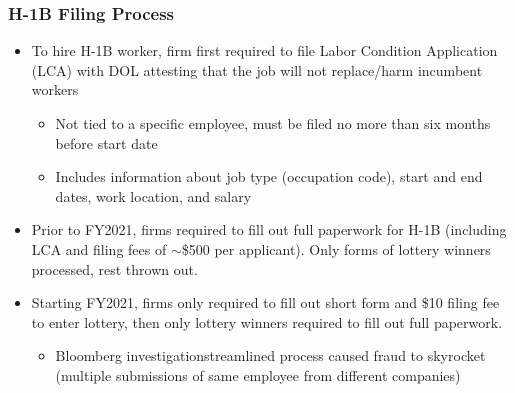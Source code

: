 \documentclass[xcolor=dvipsnames, compress, 12pt, aspectratio=169, handout]{beamer}
\begin{document}
\begin{frame}\label{h1bfiling}
    \frametitle{H-1B Filing Process}
        \begin{itemize}
            \item To hire H-1B worker, firm first required to file Labor Condition Application (LCA) with DOL attesting that the job will not replace/harm incumbent workers
            \begin{itemize}
                \item Not tied to a specific employee, must be filed no more than six months before start date
                \item Includes information about job type (occupation code), start and end dates, work location, and salary
            \end{itemize}
            \item Prior to FY2021, firms required to fill out full paperwork for H-1B (including LCA and filing fees of $\sim$\$500 per applicant). Only forms of lottery winners processed, rest thrown out. 
            \item Starting FY2021, firms only required to fill out short form and \$10 filing fee to enter lottery, then only lottery winners required to fill out full paperwork. 
            \begin{itemize}
                \item Bloomberg investigation\textemdash streamlined process caused fraud to skyrocket (multiple submissions of same employee from different companies)
            \end{itemize}
        \end{itemize}
\end{frame}
\end{document}
